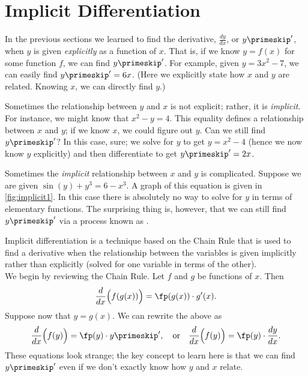 \section{Implicit Differentiation}\label{sec:imp_deriv}

In the previous sections we learned to find the derivative, $ \frac{dy}{dx}$, or $y\primeskip'$, when $y$ is given \textit{explicitly} as a function of $x$. That is, if we know $y=f(x)$ for some function $f$, we can find $y\primeskip'$. For example, given  $y=3x^2-7$, we can easily find $y\primeskip'=6x$. (Here we explicitly state how $x$ and $y$ are related. Knowing $x$, we can directly find $y$.)

Sometimes the relationship between $y$ and $x$ is not explicit; rather, it is \textit{implicit}. For instance, we might know that $x^2-y=4$. This equality defines a relationship between $x$ and $y$; if we know $x$, we could figure out $y$. Can we still find $y\primeskip'$?  In this case, sure; we  solve for $y$ to get $y=x^2-4$ (hence we now know $y$ explicitly)  and then differentiate to get $y\primeskip'=2x$.

Sometimes the \textit{implicit} relationship between $x$ and $y$ is complicated.  Suppose we are given $\sin(y)+y^3=6-x^3$. A graph of this equation is given in \autoref{fig:implicit1}. In this case there is absolutely no way to solve for $y$ in terms of elementary functions.  The surprising thing is, however, that we can still find $y\primeskip'$ via a process known as .


Implicit differentiation is a technique based on the Chain Rule that is used to find a derivative when the relationship between the variables is given implicitly rather than explicitly (solved for one variable in terms of the other). \\

We begin by reviewing the Chain Rule. Let $f$ and $g$ be functions of $x$. Then $$\frac{d}{dx}\Big(f(g(x))\Big) = \fp(g(x))\cdot g'(x).$$ Suppose now that $y=g(x)$. We can rewrite the above as
\begin{equation}
\frac{d}{dx}\Big(f(y)\Big) = \fp(y)\cdot y\primeskip', \quad \text{or}\quad
\frac{d}{dx}\Big(f(y)\Big) = \fp(y)\cdot \frac{dy}{dx} .\label{eq:implicit1}
\end{equation}
These equations look strange; the key concept to learn here is that we can find $y\primeskip'$ even if we don't exactly know how $y$ and $x$ relate.\\

